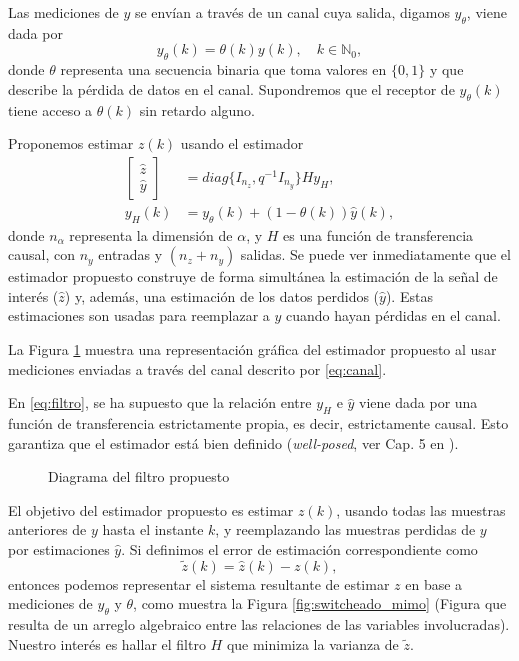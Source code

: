 Las mediciones de $y$ se env\'ian a trav\'es de un canal cuya salida, digamos $y_{\theta}$, viene dada por
\begin{equation}\label{eq:canal}
y_{\theta}(k)=\theta(k)y(k),\quad k\in \mathbb{N}_{0},
\end{equation}
donde $\theta$ representa una secuencia binaria que toma valores en $\{0,1\}$ y que describe la p\'erdida de datos en el canal. Supondremos que el receptor de $y_{\theta}(k)$ tiene acceso a $\theta(k)$ sin retardo alguno.

Proponemos estimar $z(k)$ usando el estimador
\begin{align}\label{eq:filtro}
\left[\begin{array}{cc}\hat{z}\\ \hat{y}\end{array}\right]&=diag\{ I_{n_z},q^{-1}I_{n_y}\}Hy_H,\\
\label{eq:yh}
y_{H}(k)&=y_{\theta}(k)+(1-\theta(k))\hat{y}(k),
\end{align}
donde $n_{\alpha}$ representa la dimensi\'on de $\alpha$, y $H$ es una funci\'on de transferencia causal, con $n_y$ entradas y $(n_z+n_y)$ salidas. Se puede ver inmediatamente que el estimador propuesto construye de forma simult\'anea la estimaci\'on de la se\~nal de inter\'es ($\hat{z}$) y, adem\'as, una estimaci\'on de los datos perdidos ($\hat{y}$). Estas estimaciones son usadas para reemplazar a $y$ cuando hayan p\'erdidas en el canal.

La Figura \ref{fig:propuesto_mimo} muestra una representaci\'on gr\'afica del estimador propuesto al usar mediciones enviadas a trav\'es del canal descrito por \eqref{eq:canal}.

\begin{obs}
En \eqref{eq:filtro}, se ha supuesto que la relaci\'on entre $y_{H}$ e $\hat{y}$ viene dada por una funci\'on de transferencia estrictamente propia, es decir, estrictamente causal. Esto garantiza que el estimador est\'a bien definido (\emph{well-posed}, ver Cap. 5 en \cite{zhdogl96}). 
\end{obs}

\begin{figure}[htbp]
\centering
\scalebox{0.9}{}
\caption{Diagrama del filtro propuesto}
\label{fig:propuesto_mimo}
\end{figure}

El objetivo del estimador propuesto es estimar $z(k)$, usando todas las muestras
anteriores de $y$ hasta el instante $k$, y reemplazando las muestras perdidas de $y$ por estimaciones $\hat{y}$. Si definimos el error de estimaci\'on correspondiente como
\begin{equation}
\label{ztilde}
\tilde{z}(k)=\hat{z}(k)-z(k),
\end{equation}
entonces podemos representar el sistema resultante de estimar $z$ en base a mediciones de $y_{\theta}$ y $\theta$, como muestra la Figura \ref{fig:switcheado_mimo} (Figura que resulta de un arreglo algebraico entre las relaciones de las variables involucradas). Nuestro inter\'es es hallar el filtro $H$ que minimiza la varianza de $\tilde{z}$.

